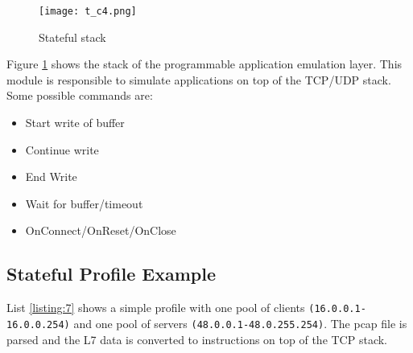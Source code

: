 \documentclass[conference]{IEEEtran}
\begin{document}
\begin{figure}[h]
  \texttt{[image: t\_c4.png]}
  \caption{Stateful stack}
  \label{fig:astf_stack}
\end{figure}

Figure \ref{fig:astf_stack} shows the stack of the programmable application emulation layer. This module is responsible to simulate applications on top of the TCP/UDP stack. 
Some possible commands are:

\begin{itemize}
  \item Start write of buffer
  \item Continue write
  \item End Write
  \item Wait for buffer/timeout
  \item OnConnect/OnReset/OnClose
\end{itemize}


\subsection{Stateful Profile Example}


List \ref{listing:7} shows a simple profile with one pool of clients \texttt{(16.0.0.1-16.0.0.254)} and one pool of servers \texttt{(48.0.0.1-48.0.255.254)}. 
The pcap file is parsed and the L7 data is converted to instructions on top of the TCP stack.
\end{document}
